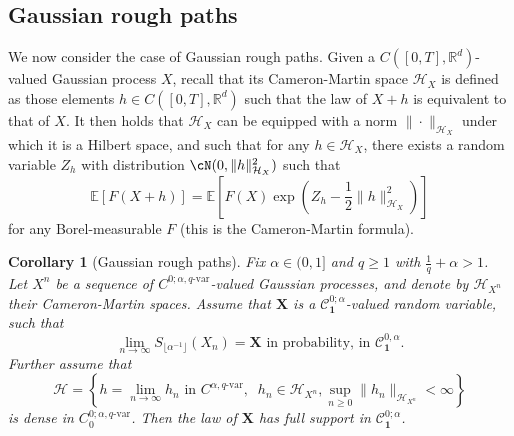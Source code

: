 \documentclass[12pt,a4paper]{article}
\numberwithin{equation}{section}
\def\cH{\mathcal{H}}\def\cI{\mathcal{I}}
\def\bR{\mathbb{R}}\def\bS{\mathbb{S}}
\def\bE{\mathbb{E}}\def\bW{\mathbb{W}}
\theoremstyle{plain}
\newtheorem{corollary}[theorem]{Corollary}
\theoremstyle{definition}
\theoremstyle{remark}
\begin{document}
\subsection*{Gaussian rough paths}
We now consider the case of Gaussian rough paths. Given a $C([0,T],\bR^d)$-valued Gaussian process $X$, recall that its Cameron-Martin space $\cH_X$ is defined as those elements $h \in C([0,T],\bR^d)$ such that the law of $X+h$ is equivalent to that of $X$. It then holds that $\cH_X$ can be equipped with a norm $\|\cdot\|_{\cH_X}$ under which it is a Hilbert space, and such that for any $h \in \cH_X$, there exists a random variable $Z_h$ with distribution $\cN(0,\|h\|_{\cH_X}^2)$ such that
\[
\bE\left[F(X+ h) \right] = \bE\left[ F(X) \exp\left(Z_h - \frac 1 2 \|h\|_{\cH_X}^2\right)\right]
\]
for any Borel-measurable $F$ (this is the Cameron-Martin formula).



\begin{corollary}[Gaussian rough paths] \label{cor:gauss}
Fix  $\alpha \in (0,1]$ and $q \geq 1$ with $\frac{1}{q}+\alpha>1$. Let $X^n$ be a sequence of $C^{0;\alpha,q\text{-var}}$-valued Gaussian processes, and denote by  $\cH_{X^n}$ their Cameron-Martin spaces. Assume that $\mathbf{X}$ is a $\mathcal{C}^{0;\alpha}_{\mathbf{1}}$-valued random variable, such that
 \[
 \lim_{n \to \infty} S_{\lfloor \alpha^{-1} \rfloor}\left( X_n \right) = \mathbf{X} \mbox{ in probability, in }\mathcal{C}^{0,\alpha}_{\mathbf{1}}.
 \]
Further assume that
\[
\cH = \left\{ h = \lim_{n \to \infty} h_n \mbox{ in }C^{\alpha,q\text{-var}}, \;\; h_n \in \mathcal{H}_{X^n}, \sup_{n\geq 0} \|h_n\|_{\cH_{X^n}} < \infty \right\}
\]
is dense in $C^{0;\alpha,q\text{-var}}_0$. Then the law of $\mathbf{X}$ has full support in $\mathcal{C}^{0;\alpha}_{\mathbf{1}}$.
\end{corollary}
\end{document}
